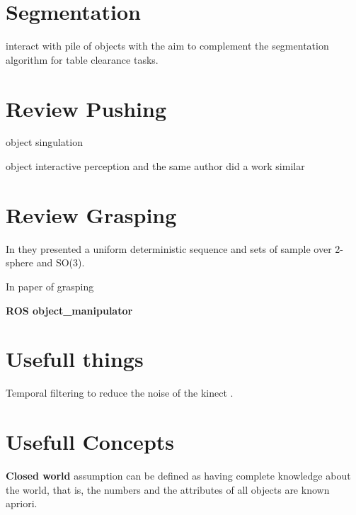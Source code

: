 \section{Segmentation}
\citep{katz2014perceiving} interact with pile of objects with the aim to complement the segmentation algorithm for table clearance tasks.

\section{Review Pushing}
\citep{conf/iros/HermansRB12} object singulation

\citep{katz2011interactive} object interactive perception and the same author did a work similar \citep{Katz_2013_7407} 

\citep{lynch1996stable}

\section{Review Grasping}
In \citep{DBLP:conf/icra/YershovaL04} they presented a uniform deterministic sequence and sets of sample over 2-sphere and SO(3).

In \cite{Dang-semantic-grasping} paper of grasping

\textbf{ROS object\_manipulator}

\section{Usefull things}
Temporal filtering to reduce the noise of the kinect	 \citep{SSS147762}.

\section{Usefull Concepts}
 \textbf{Closed world} assumption \citep{Reiter87} can be defined
as having complete knowledge about the world, that is, the numbers and the attributes
of all objects are known apriori. 

